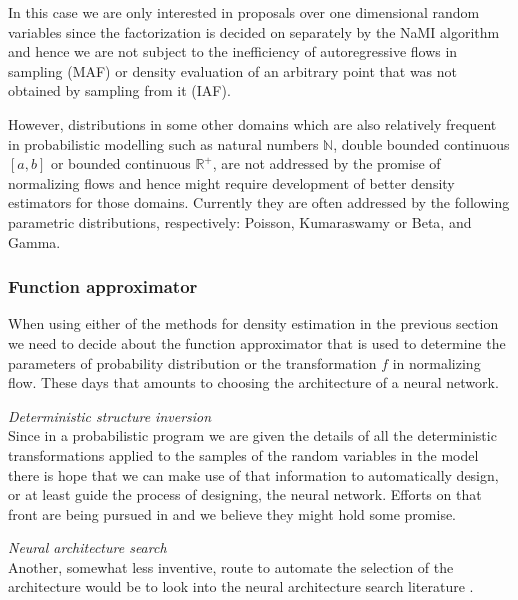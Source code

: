 \documentclass[12pt]{article}
\begin{document}
In this case we are only interested in proposals over one dimensional random variables since the factorization is decided on separately by the NaMI algorithm and hence we are not subject to the inefficiency of autoregressive flows in sampling (MAF) or density evaluation of an arbitrary point that was not obtained by sampling from it (IAF).

However, distributions in some other domains which are also relatively frequent in probabilistic modelling such as natural numbers $\mathbb{N}$, double bounded continuous $[a,b]$ or bounded continuous $\mathbb{R}^+$, are not addressed by the promise of normalizing flows and hence might require development of better density estimators for those domains.
Currently they are often addressed by the following parametric distributions, respectively: Poisson, Kumaraswamy or Beta, and Gamma.




\subsubsection*{Function approximator}
When using either of the methods for density estimation in the previous section we need to decide about the function approximator that is used to determine the parameters of probability distribution or the transformation $f$ in normalizing flow.
These days that amounts to choosing the architecture of a neural network.


\emph{Deterministic structure inversion}\\
Since in a probabilistic program we are given the details of all the deterministic transformations applied to the samples of the random variables in the model there is hope that we can make use of that information to automatically design, or at least guide the process of designing, the neural network.   
Efforts on that front are being pursued in \citep{TavaresEtAl2016,TavaresEtAl2017} and we believe they might hold some promise.

\emph{Neural architecture search}\\
Another, somewhat less inventive, route to automate the selection of the architecture would be to look into the neural architecture search literature \citep{ElskenEtAl2018,ZophLe2017,pham18a}.

\end{document}
